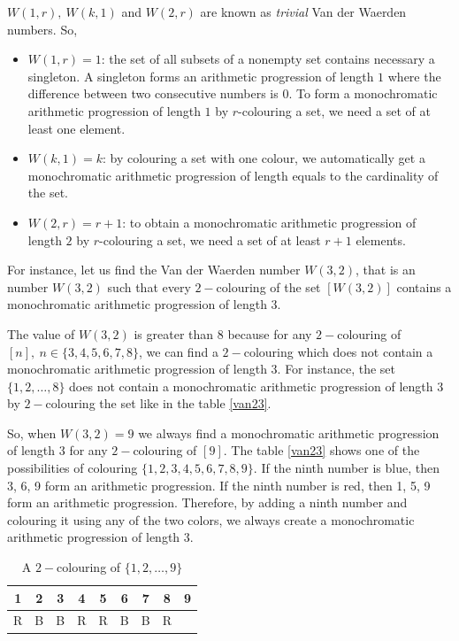 $W(1,r), \ W(k,1)$ and $W(2,r)$ are known as \textit{trivial} Van der Waerden numbers. So, 
\begin{itemize}
\item $W(1,r)=1$:  the set of all subsets of a nonempty set contains necessary a singleton. A singleton forms an arithmetic progression of length $1$ where the difference between two consecutive numbers is $0.$ To form a monochromatic arithmetic progression of length $1$ by $r$-colouring a set, we need  a set of at least one element. 
\item $W(k,1)=k$: by colouring a set with one colour, we automatically get a monochromatic arithmetic progression of length equals to the cardinality  of the set.
\item $W(2,r)=r+1$: to obtain a monochromatic arithmetic progression of length $2$ by $r$-colouring a set, we need a set of at least $r+1$ elements.
\end{itemize}

For instance, let us find the Van der Waerden number $W(3,2)$, that is an number $W(3,2)$ such that every $2-$colouring  of the set $[W(3,2)]$ contains a monochromatic arithmetic progression of length $3.$

The value of $W(3,2)$ is greater than $8$ because for any $2-$colouring of $[n],\ n\in \{3,4,5,6,7,8\}$, we can find a $2-$colouring which does not contain a monochromatic arithmetic progression of length 3. For instance, the set  $\{1,2,\ldots, 8\}$ does not contain a monochromatic  arithmetic progression of length $3$ by $2-$colouring the set  like in the table \eqref{van23}.

So, when $W(3,2)=9$ we always find a monochromatic arithmetic progression of length 3 for any $2-$colouring of $[9].$ The table \eqref{van23} shows one of the possibilities of colouring $\{1,2,3,4,5,6,7,8,9\}.$  If the ninth number is {\color{blue} blue}, then{ \color{blue}3, 6, 9}  form an arithmetic progression. If the ninth number is {\color{red} red}, then {\color{red}1, 5, 9} form an arithmetic progression. Therefore, by adding a ninth number and colouring it using any of the two colors, we always create  a monochromatic arithmetic progression of length 3.

\begin{table}[h]
\begin{center}
\begin{tabular}{ccccccccc}
\hline
1 & 2 & 3 & 4  & 5 & 6 & 7 & 8 & 9 \\ \hline
\color{red}R & \color{blue}B & \color{blue}B & \color{red}R & \color{red}R & \color{blue}B & \color{blue}B & \color{red}R  & \\
\hline 
\end{tabular} 
\end{center}
\caption{A $2-$colouring of $\{1,2,\ldots, 9\}$} \label{van23}
\end{table}

